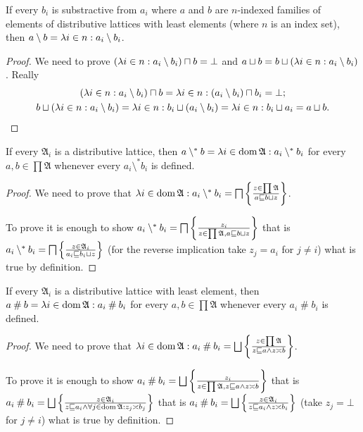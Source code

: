 \begin{prop}
If every $b_{i}$ is substractive from $a_{i}$ where $a$ and $b$
are $n$-indexed families of elements of distributive lattices with least elements
(where $n$ is an index set), then $a\setminus b=\lambda i\in n:a_{i}\setminus b_{i}$.\end{prop}
\begin{proof}
We need to prove $(\lambda i\in n:a_{i}\setminus b_{i})\sqcap b=\bot$
and $a\sqcup b=b\sqcup(\lambda i\in n:a_{i}\setminus b_{i})$. Really
\begin{gather*}
(\lambda i\in n:a_{i}\setminus b_{i})\sqcap b=\lambda i\in n:(a_{i}\setminus b_{i})\sqcap b_{i}=\bot;\\
b\sqcup(\lambda i\in n:a_{i}\setminus b_{i})=\lambda i\in n:b_{i}\sqcup(a_{i}\setminus b_{i})=\lambda i\in n:b_{i}\sqcup a_{i}=a\sqcup b.
\end{gather*}
\end{proof}
\begin{prop}
If every $\mathfrak{A}_{i}$ is a distributive lattice, then $a\setminus^{\ast}b=\lambda i\in\operatorname{dom}\mathfrak{A}:a_{i}\setminus^{\ast}b_{i}$
for every $a,b\in\prod\mathfrak{A}$ whenever every $a_{i}\setminus^{\ast}b_{i}$
is defined.\end{prop}
\begin{proof}
We need to prove that $\lambda i\in\operatorname{dom}\mathfrak{A}:a_{i}\setminus^{\ast}b_{i}=\bigsqcap\left\{ \frac{z\in\prod\mathfrak{A}}{a\sqsubseteq b\sqcup z}\right\}$.

To prove it is enough to show $a_{i}\setminus^{\ast}b_{i}=\bigsqcap\left\{ \frac{z_{i}}{z\in\prod\mathfrak{A},a\sqsubseteq b\sqcup z}\right\}$
that is $a_{i}\setminus^{\ast}b_{i}=\bigsqcap\left\{ \frac{z\in\mathfrak{A}_{i}}{a_{i}\sqsubseteq b_{i}\sqcup z}\right\}$
(for the reverse implication take $z_{j}=a_{i}$ for $j\neq i$) what
is true by definition.\end{proof}
\begin{prop}
If every $\mathfrak{A}_{i}$ is a distributive lattice with least
element, then $a\mathbin\#b=\lambda i\in\operatorname{dom}\mathfrak{A}:a_{i}\mathbin\#b_{i}$
for every $a,b\in\prod\mathfrak{A}$ whenever every $a_{i}\mathbin\#b_{i}$
is defined.\end{prop}
\begin{proof}
We need to prove that $\lambda i\in\operatorname{dom}\mathfrak{A}:a_{i}\mathbin\#b_{i}=\bigsqcup\left\{ \frac{z\in\prod\mathfrak{A}}{z\sqsubseteq a\land z\asymp b}\right\}$.

To prove it is enough to show $a_{i}\mathbin\#b_{i}=\bigsqcup\left\{ \frac{z_{i}}{z\in\prod\mathfrak{A},z\sqsubseteq a\land z\asymp b}\right\}$
that is $a_{i}\mathbin\#b_{i}=\bigsqcup\left\{ \frac{z\in\mathfrak{A}_{i}}{z\sqsubseteq a_{i}\land\forall j\in\operatorname{dom}\mathfrak{A}:z_{j}\asymp b_{j}}\right\}$
that is $a_{i}\mathbin\#b_{i}=\bigsqcup\left\{ \frac{z\in\mathfrak{A}_{i}}{z\sqsubseteq a_{i}\land z\asymp b_{i}}\right\}$
(take $z_{j}=\bot$ for $j\ne i$) what is true by definition.\end{proof}
